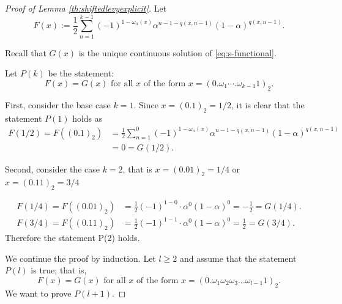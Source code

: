 \documentclass[epsf,10pt]{article}
\begin{document}
\begin{proof}[Proof of Lemma \ref{th:shiftedlevyexplicit}]

Let 
\begin{equation*}
F(x) := \frac{1}{2}\sum_{n=1}^{k-1}(-1)^{1-\omega_n(x)}\alpha^{n-1-q(x,n-1)}(1-\alpha)^{q(x,n-1)}.
\end{equation*}

Recall that $G(x)$ is the unique continuous solution of \eqref{eq:s-functional}.

Let $P(k)$ be the statement: 
$$F(x)=G(x) \mbox{ for all } x \mbox{ of the form } x=(0.\omega_1 \cdots .\omega_{k-1} 1)_{2}.$$

First, consider the base case $k=1$. Since $x=(0.1)_{2}=1/2$, it is clear that the statement $P(1)$ holds as  
\begin{align*}
F(1/2)=F((0.1)_{2}) &= \frac{1}{2}\sum_{n=1}^{0}(-1)^{1- \omega_n(x)}\alpha^{n-1-q(x,n-1)}(1-\alpha)^{q(x,n-1)}\\
& = 0 =G(1/2). 
\end{align*}

Second, consider the case $k=2$, that is $x=(0.01)_2=1/4$ or $x=(0.11)_2= 3/4$

\begin{align*}
F(1/4)=F((0.01)_{2}) &= \frac{1}{2}(-1)^{1-0}\cdot \alpha^0(1-\alpha)^0 =-\frac{1}{2} =G(1/4). \\
F(3/4)=F((0.11)_{2}) &= \frac{1}{2}(-1)^{1-1}\cdot \alpha^0(1-\alpha)^0 =\frac{1}{2} =G(3/4). 
\end{align*}
Therefore the statement P(2) holds.

We continue the proof by induction. Let $l \geq 2$ and assume that the statement $P(l)$ is true; that is,  
$$F(x) = G(x) \mbox { for all } x \mbox{ of the form } x=(0.\omega_1\omega_2\omega_3 \dots \omega_{l-1}1)_2.$$ 
We want to prove $P(l+1)$.

\medskip


\end{proof}
\end{document}
